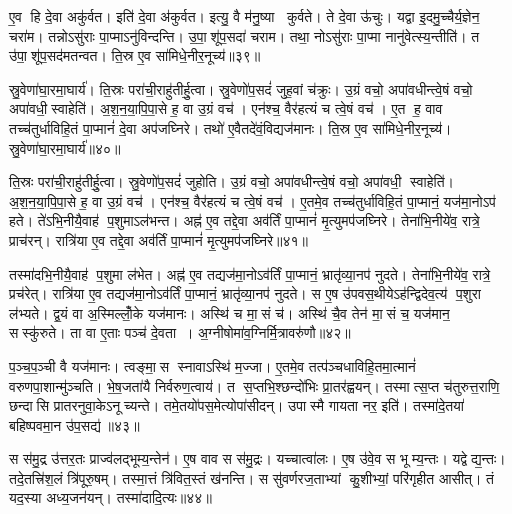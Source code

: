 ए॒व हि दे॒वा अकु॑र्वत।
इति॑ दे॒वा अ॑कुर्वत।
इत्यु॒ वै म॑नु॒ष्या कुर्वते।
ते दे॒वा ऊ॑चुः।
यद्वा इ॒दमु॒च्चैर्य॒ज्ञेन॒ चरा॑म।
तन्नोऽसु॑राः पा॒प्माऽनु॑विन्दन्ति।
उ॒पा॒शू॑प॒सदा॑ चराम।
तथा॒ नोऽसु॑राः पा॒प्मा नानु॑वेत्स्य॒न्तीति॑।
त उ॑पा॒शू॑प॒सद॑मतन्वत।
ति॒स्र ए॒व सा॑मिधे॒नीर॒नूच्य॑॥३९॥

स्रु॒वेणा॑घा॒रमा॒घार्य॑।
ति॒स्रः परा॑ची॒राहु॑तीर्\mbox{}हु॒त्वा।
स्रु॒वेणो॑प॒सदं॑ जुह॒वां च॑क्रुः।
उ॒ग्रं वचो॒ अपा॑वधीन्त्वे॒षं वचो॒ अपा॑वधी॒स्वाहेति॑।
अ॒श॒न॒या॒पि॒पा॒से ह॒ वा उ॒ग्रं वच॑।
एन॑श्च॒ वैर॑हत्यं च त्वे॒षं वच॑।
ए॒त ह॒ वाव तच्च॑तुर्धाविहि॒तं पा॒प्मानं॑ दे॒वा अप॑जघ्निरे।
तथो॑ ए॒वैतदे॑वं॒विद्यज॑मानः।
ति॒स्र ए॒व सा॑मिधे॒नीर॒नूच्य॑।
स्रु॒वेणा॑घा॒रमा॒घार्य॑॥४०॥

ति॒स्रः परा॑ची॒राहु॑तीर्\mbox{}हु॒त्वा।
स्रु॒वेणो॑प॒सदं॑ जुहोति।
उ॒ग्रं वचो॒ अपा॑वधीन्त्वे॒षं वचो॒ अपा॑वधी॒ स्वाहेति॑।
अ॒श॒न॒या॒पि॒पा॒से ह॒ वा उ॒ग्रं वच॑।
एन॑श्च॒ वैर॑हत्यं च त्वे॒षं वच॑।
ए॒तमे॒व तच्च॑तुर्धाविहि॒तं पा॒प्मानं॒ यज॑मा॒नोऽप॑ हते।
ते॑ऽभि॒नीयै॒वाह॑ प॒शुमाऽल॑भन्त।
अह्न॑ ए॒व तद्दे॒वा अव॑र्तिं पा॒प्मानं॑ मृ॒त्युमप॑जघ्निरे।
तेना॑भि॒नीये॑व॒ रात्रे॒ प्राच॑रन्।
रात्रि॑या ए॒व तद्दे॒वा अव॑र्तिं पा॒प्मानं॑ मृ॒त्युमप॑जघ्निरे॥४१॥

तस्मा॑दभि॒नीयै॒वाह॑ प॒शुमा ल॑भेत।
अह्न॑ ए॒व तद्यज॑मा॒नोऽव॑र्तिं पा॒प्मानं॒ भ्रातृ॑व्या॒नप॑ नुदते।
तेना॑भि॒नीये॑व॒ रात्रे॒ प्रच॑रेत्।
रात्रि॑या ए॒व तद्यज॑मा॒नोऽव॑र्तिं पा॒प्मानं॒ भ्रातृ॑व्या॒नप॑ नुदते।
स ए॒ष उ॑पवस॒थीयेऽह॑न्द्विदेव॒त्य॑ प॒शुरा ल॑भ्यते।
द्व॒यं वा अ॒स्मिल्लोँ॒के यज॑मानः।
अस्थि॑ च मा॒सं च॑।
अस्थि॑ चै॒व तेन॑ मा॒सं च॒ यज॑मान॒ सस्कु॑रुते।
ता वा ए॒ताः पञ्च॑ दे॒वता।
अ॒ग्नीषोमा॑व॒ग्निर्मि॒त्रावरु॑णौ॥४२॥

प॒ञ्च॒प॒ञ्ची वै यज॑मानः।
त्वङ्मा॒स स्नावाऽस्थि॑ म॒ज्जा।
ए॒तमे॒व तत्प॑ञ्चधाविहि॒तमा॒त्मानं॑ वरुणपा॒शान्मु॑ञ्चति।
भे॒ष॒जता॑यै निर्वरुण॒त्वाय॑।
त स॒प्तभि॒श्छन्दो॑भिः प्रा॒तर॑ह्वयन्।
तस्मात्स॒प्त च॑तुरुत्त॒राणि॒ छन्दासि प्रातरनुवा॒केऽनूच्यन्ते।
तमे॒तयो॑पस॒मेत्योपा॑सीदन्।
उपास्मै गायता नर॒ इति॑।
तस्मा॑दे॒तया॑ बहिष्पवमा॒न उ॑प॒सद्य॑॥४३॥\anuvakamend[ऐ॒च्छ॒न्न॒न॒य॒स्ति॒ष्ठ॒न्ते॒ऽनूच्या॒नूच्य॑ स्रु॒वेणा॑घा॒रमा॒घार्य॒ रात्रि॑या ए॒व तद्दे॒वा अव॑र्तिं पा॒प्मानं॑ मृ॒त्युमप॑जघ्निरे मि॒त्रावरु॑णौ॒ नव॑ च (दे॒वा यज॑मानो दे॒वा दे॒वा यज॑मानो॒ यज॑मान॒ प्राच॑रं॒ प्रच॑रे॒दाल॑भ॒न्ताल॑भेत मृ॒त्युमप॑जघ्निरे॒ भ्रातृ॑व्यान्॥)]

स स॑मु॒द्र उ॑त्तर॒तः प्राज्व॑लद्भूम्य॒न्तेन॑।
ए॒ष वाव स स॑मु॒द्रः।
यच्चात्वा॑लः।
ए॒ष उ॑वे॒व स भूम्य॒न्तः।
यद्वेद्य॒न्तः।
तदे॒तत्त्रि॑श॒लं त्रि॑पूरु॒षम्।
तस्मा॒त्तं त्रि॑वित॒स्तं ख॑नन्ति।
स सु॑वर्णरज॒ताभ्यां कु॒शीभ्यां॒ परि॑गृहीत आसीत्।
तं यद॒स्या अध्य॒जन॑यन्।
तस्मा॑दादि॒त्यः॥४४॥

